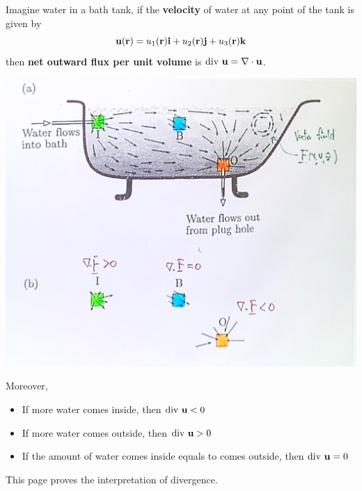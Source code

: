 \documentclass[11pt, a4paper]{MATH2023}
\newcommand{\ii}{{\bf i}}
\newcommand{\jj}{{\bf j}}
\newcommand{\kk}{{\bf k}}
\newcommand{\rr}{{\bf r}}
\renewcommand{\div}{{\rm div\ }}
\begin{document}
\begin{spacing}{1.3}
    Imagine water in a bath tank, if the {\bf velocity} of water at any point 
    of the tank is given by $$\uu (\rr)=u_1(\rr) \ii +u_2(\rr) \jj + u_3(\rr)\kk$$
    then {\bf net outward flux per unit volume} is $\div \uu =\nabla \cdot \uu$.
    \begin{center}
        \includegraphics[scale=0.18]{images/Ch15-bath.JPG}
    \end{center}
    Moreover, 
    \begin{itemize}
        \item If more water comes inside, then $\div \uu <0$
        \item If more water comes outside, then $\div \uu >0$
        \item If the amount of water comes inside equals to comes outside, then $\div \uu =0$
    \end{itemize}

    \newpage
    {\blue This page proves the interpretation of divergence.}
    \begin{center}
    \begin{tikzpicture}[x=0.75pt,y=0.75pt,yscale=-1,xscale=1,scale=1.3]


\end{tikzpicture}
\end{center}
\end{spacing}
\end{document}
